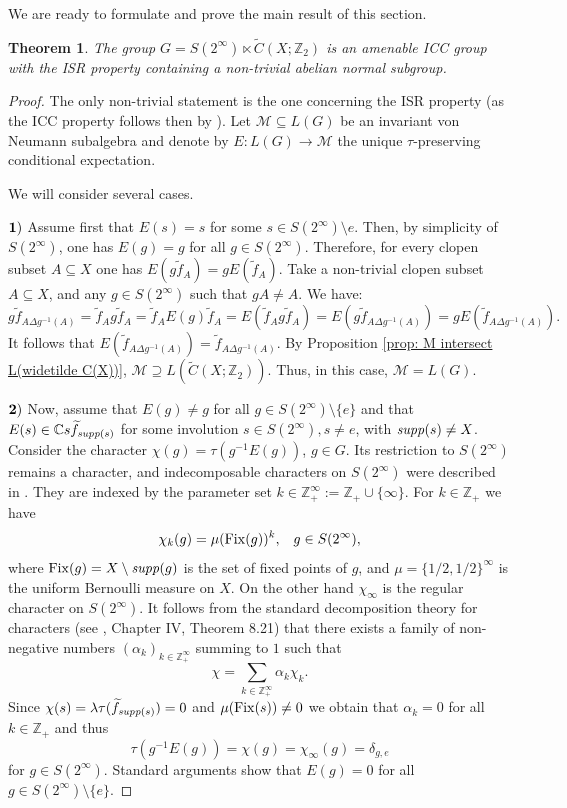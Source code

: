 \documentclass[11pt]{amsart}
\newcommand{\suppg}{{\it supp}}
\newcommand{\fix}{{\rm Fix}}
\theoremstyle{plain}
\newtheorem{theorem}{Theorem}[section]
\theoremstyle{definition}
\theoremstyle{remark}
\numberwithin{equation}{section}
\begin{document}
We are ready to formulate and prove the main result of this section.
\begin{theorem}\label{th: S(2^infty) and ISR}
	The group $G=S(2^\infty)\ltimes \widetilde C(X;\mathbb{Z}_2)$ is an amenable ICC group with the ISR property containing a non-trivial abelian normal subgroup. 
\end{theorem} 
\begin{proof}
The only non-trivial statement is the one concerning the ISR property (as the ICC property follows then by \cite[Proposition 3.1]{amrutam2023invariant}). Let $\mathcal{M}\subseteq L(G)$ be an invariant von Neumann subalgebra  and denote by $E:L(G) \to \mathcal{M}$ the unique $\tau$-preserving conditional expectation.

We will consider several cases.

\noindent ${\bf 1)}$ Assume first that $E(s)=s$ for some $s\in S(2^\infty)\setminus e$. Then, by simplicity of $S(2^\infty)$, one has $E(g)=g$ for all $g\in S(2^\infty)$. Therefore, for every clopen subset $A\subseteq X$ one has $E(g\widetilde f_A)=gE(\widetilde f_A)$. Take a non-trivial clopen subset $A\subseteq X$, and any $g\in S(2^\infty)$ such that $gA\neq A$. We have:
$$g\widetilde f_{A\Delta g^{-1}(A)}=\widetilde f_A g\widetilde f_A=\widetilde f_A E(g)\widetilde f_A=E(\widetilde f_A g\widetilde f_A)=E(g\widetilde f_{A\Delta g^{-1}(A)})=gE(\widetilde f_{A\Delta g^{-1}(A)}).$$ 
It follows that $E(\widetilde f_{A\Delta g^{-1}(A)})=\widetilde f_{A\Delta g^{-1}(A)}$. By Proposition \ref{prop: M intersect L(widetilde C(X))}, $\mathcal M\supseteq L(\widetilde C(X;\mathbb Z_2))$. Thus, in this case, $\mathcal M=L(G)$.

\vskip 0.1cm\noindent
	${\bf 2)}$
Now, assume that $E(g)\neq g$ for all $g\in S(2^\infty)\setminus\{e\}$ and that $E(s)\in\mathbb Cs\widetilde f_{\suppg(s)}$ for some involution $s\in S(2^\infty),s\neq e$, with $\suppg(s)\neq X$. Consider the character $\chi(g)=\tau(g^{-1}E(g))$, $g \in G$. Its restriction to $S(2^\infty)$ remains a character, 
and indecomposable characters on $S(2^\infty)$ were described in \cite{dudko_jfa2011}. They are indexed by the parameter set $k\in\mathbb{Z}_+^\infty:=\mathbb Z_+\cup\{\infty\}$. For $k\in \mathbb Z_+$ we have
$$\chi_k(g)=\mu(\fix(g))^k, \;\;\; g \in S(2^\infty),$$ 
where $\fix(g)=X\setminus \suppg(g)$ is the set of fixed points of $g$, and $\mu=\{1/2,1/2\}^\infty$ is the uniform Bernoulli measure on $X$. On the other hand $\chi_\infty$ is the regular character on $S(2^\infty)$. It follows from the standard decomposition theory for characters (see \cite{Takesaki-OperatorAlgebras}, Chapter IV, Theorem 8.21) that there exists a family of non-negative numbers $(\alpha_k)_{k\in\mathbb{Z}_+^\infty }$ summing to $1$ such that $$\chi=\sum\limits_{k\in\mathbb{Z}_+^\infty}\alpha_k\chi_k.$$ 
Since $\chi(s)=\lambda\tau(\widetilde f_{\suppg(s)})=0$ and $\mu(\fix(s))\neq 0$ we obtain that $\alpha_k=0$ for all $k\in\mathbb Z_+$ and thus $$\tau(g^{-1}E(g))=\chi(g)=\chi_\infty(g)=\delta_{g,e}$$ for $g\in S(2^\infty)$. Standard arguments show that $E(g)=0$ for all $g\in S(2^\infty)\setminus\{e\}$. 
	

\end{proof}
\end{document}
